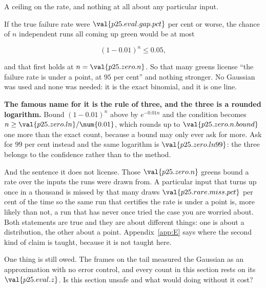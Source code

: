 \begin{fr}
\begin{ansblock}
A ceiling on the rate, and nothing at all about any particular input.
\end{ansblock}

If the true failure rate were $\val{p25.eval.gap.pct}$ per cent or worse, the
chance of $n$ independent runs all coming up green would be at most

\[ (1 - \num{0.01})^{n} \le \num{0.05}, \]

and that first holds at $n = \val{p25.zero.n}$. So that many greens license
\enquote{the failure rate is under a point, at $95$ per cent} and nothing
stronger. No Gaussian was used and none was needed: it is the exact binomial,
and it is one line.

\textbf{The famous name for it is the rule of three, and the three is a
rounded logarithm.} Bound $(1 - \num{0.01})^{n}$ above by
$e^{-\num{0.01}n}$ and the condition becomes $n \ge \val{p25.zero.ln}/\num{0.01}$,
which rounds up to $\val{p25.zero.n.bound}$ \dash{} one more than the exact
count, because a bound may only ever ask for more. Ask for $99$ per cent
instead and the same logarithm is $\val{p25.zero.ln99}$: the three belongs to
the confidence rather than to the method.

And the sentence it does not license. Those $\val{p25.zero.n}$ greens bound a
rate over the inputs the runs were drawn from. A particular input that turns
up once in a thousand is missed by that many draws
$\val{p25.rare.miss.pct}$ per cent of the time \dash{} so the same run that
certifies the rate is under a point is, more likely than not, a run that has
never once tried the case you are worried about. Both statements are true and
they are about different things: one is about a distribution, the other about
a point. Appendix~\ref{app:E} says where the second kind of claim is taught,
because it is not taught here.

One thing is still owed. The frames on the tail measured the Gaussian as an
approximation with no error control, and every count in this section rests on
its $\val{p25.eval.z}$. Is this section unsafe \dash{} and what would doing
without it cost?
\dotline
\nextframe
\end{fr}


